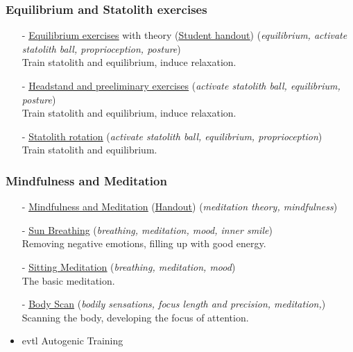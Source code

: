 \documentclass{beamer}
\begin{document}
\begin{frame}
\frametitle{Equilibrium and Statolith exercises}
\begin{itemize}
\item[-] \href{run:./Equilibrium_Exercises.pdf}{\underline{Equilibrium exercises}} 
with theory
(\href{run:./Equilibrium_Exercises_Handout.pdf}{\underline{Student handout}})
 (\textit{equilibrium, activate statolith ball, proprioception, posture})\\
Train statolith and equilibrium, induce relaxation.


\item[-] \href{run:./Headstand.pdf}{\underline{Headstand and preeliminary exercises}} 
 (\textit{activate statolith ball, equilibrium, posture})\\
Train statolith and equilibrium, induce relaxation.

\item[-] \href{run:./Statolith_rotation.pdf}{\underline{Statolith rotation}} 
 (\textit{activate statolith ball, equilibrium, proprioception})\\
Train statolith and equilibrium.
\end{itemize}
\end{frame}
\begin{frame}
\frametitle{Mindfulness and Meditation}
\begin{itemize}

\item[-] \href{run:./Mindfulness_Meditation.pdf}{\underline{Mindfulness and Meditation}} 
(\href{run:./Mindfulness_Meditation_Handout.pdf}{\underline{Handout}})
 (\textit{meditation theory, mindfulness})\\

\item[-] \href{run:./Sun_Breathing.pdf}{\underline{Sun Breathing}} 
 (\textit{breathing, meditation, mood, inner smile})\\
Removing negative emotions, filling up with good energy.
\item[-] \href{run:./Sitting_Meditation.pdf}{\underline{Sitting Meditation}} 
 (\textit{breathing, meditation, mood})\\
The basic meditation.
\item[-] \href{run:./Body_Scan.pdf}{\underline{Body Scan}} 
 (\textit{bodily sensations, focus length and precision, meditation,})\\
Scanning the body, developing the focus of attention.

\item evtl Autogenic Training
\end{itemize}
\end{frame}
\end{document}
